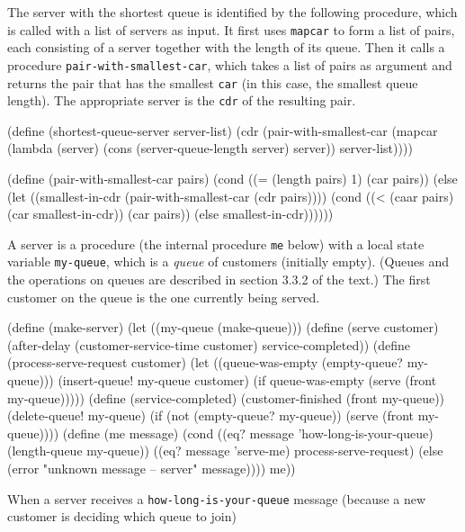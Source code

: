 The server with the shortest queue is identified by the following
procedure, which is called with a list of servers as input.  It first
uses {\tt mapcar} to
form a list of pairs, each consisting of a server together with the
length of its queue.  Then it calls a procedure
{\tt pair-with-smallest-car}, which takes a list of pairs as argument
and returns the pair that has the smallest {\tt car} (in this case, the
smallest queue length).  The appropriate server is the {\tt cdr} of the
resulting pair.

\code
(define (shortest-queue-server server-list)
  (cdr
   (pair-with-smallest-car
    (mapcar (lambda (server)
              (cons (server-queue-length server)
                    server))
            server-list))))

(define (pair-with-smallest-car pairs)
  (cond
   ((= (length pairs) 1) (car pairs))
   (else (let ((smallest-in-cdr
                (pair-with-smallest-car (cdr pairs))))
           (cond
            ((< (caar pairs) (car smallest-in-cdr))
             (car pairs))
            (else smallest-in-cdr))))))
\uncode


A server is a procedure (the internal procedure {\tt me} below) with
a local state variable {\tt my-queue}, which is a {\it queue} of
customers (initially empty).  (Queues and the operations on queues
are described in section 3.3.2 of the text.)
The first customer on the queue is the one currently being served.

\code
(define (make-server)
  (let ((my-queue (make-queue)))
    (define (serve customer)
      (after-delay (customer-service-time customer)
                   service-completed))
    (define (process-serve-request customer)
      (let ((queue-was-empty (empty-queue? my-queue)))
        (insert-queue! my-queue customer)
        (if queue-was-empty
            (serve (front my-queue)))))
    (define (service-completed)
      (customer-finished (front my-queue))
      (delete-queue! my-queue)
      (if (not (empty-queue? my-queue))
          (serve (front my-queue))))
    (define (me message)
      (cond ((eq? message 'how-long-is-your-queue)
             (length-queue my-queue))
            ((eq? message 'serve-me) process-serve-request)
            (else (error "unknown message -- server" message))))
    me))
\uncode

When a server receives a {\tt how-long-is-your-queue} message
(because a new customer is deciding which queue to join)


